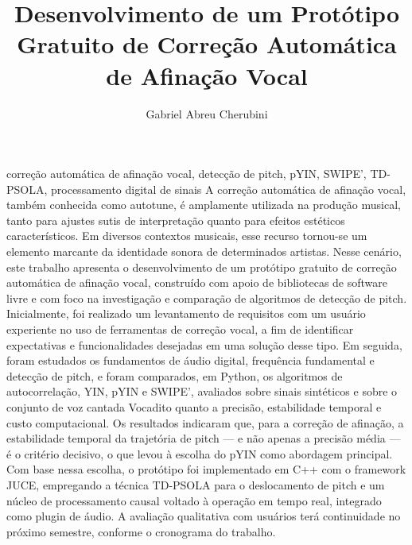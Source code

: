 \documentclass[portuguese,oneside]{tcc}
\author{Gabriel Abreu Cherubini}
\title{Desenvolvimento de um Protótipo Gratuito de Correção Automática de Afinação Vocal}
      {Development of a Automatic Vocal Pitch Correction Prototype}
\begin{document}
\begin{resumo}{correção automática de afinação vocal, detecção de pitch, pYIN, SWIPE', TD-PSOLA, processamento digital de sinais}
A correção automática de afinação vocal, também conhecida como autotune, é amplamente utilizada na produção musical, tanto para ajustes sutis de interpretação quanto para efeitos estéticos característicos. Em diversos contextos musicais, esse recurso tornou-se um elemento marcante da identidade sonora de determinados artistas. Nesse cenário, este trabalho apresenta o desenvolvimento de um protótipo gratuito de correção automática de afinação vocal, construído com apoio de bibliotecas de software livre e com foco na investigação e comparação de algoritmos de detecção de pitch. Inicialmente, foi realizado um levantamento de requisitos com um usuário experiente no uso de ferramentas de correção vocal, a fim de identificar expectativas e funcionalidades desejadas em uma solução desse tipo. Em seguida, foram estudados os fundamentos de áudio digital, frequência fundamental e detecção de pitch, e foram comparados, em Python, os algoritmos de autocorrelação, YIN, pYIN e SWIPE', avaliados sobre sinais sintéticos e sobre o conjunto de voz cantada Vocadito quanto a precisão, estabilidade temporal e custo computacional. Os resultados indicaram que, para a correção de afinação, a estabilidade temporal da trajetória de pitch --- e não apenas a precisão média --- é o critério decisivo, o que levou à escolha do pYIN como abordagem principal. Com base nessa escolha, o protótipo foi implementado em C++ com o framework JUCE, empregando a técnica TD-PSOLA para o deslocamento de pitch e um núcleo de processamento causal voltado à operação em tempo real, integrado como plugin de áudio. A avaliação qualitativa com usuários terá continuidade no próximo semestre, conforme o cronograma do trabalho.
\end{resumo}




\tableofcontents     %







%

\end{document}
